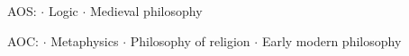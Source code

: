 	\textcolor{highlight2}{AOS: $\cdot$ Logic $\cdot$ Medieval philosophy}
	
	\vspace*{-1ex}
	\textcolor{highlight2}{AOC: $\cdot$ Metaphysics $\cdot$ Philosophy of religion $\cdot$ Early modern philosophy}
